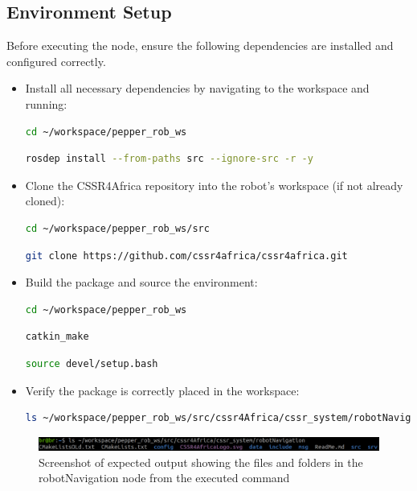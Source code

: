 \documentclass{CSSRforAfrica}
\begin{document}
\subsection{Environment Setup}
Before executing the node, ensure the following dependencies are installed and configured correctly.
\begin{itemize}
\item Install all necessary dependencies by navigating to the workspace and running:
\begin{lstlisting}[style=withoutNumbering, language=bash]
cd ~/workspace/pepper_rob_ws
\end{lstlisting}
\begin{lstlisting}[style=withoutNumbering, language=bash]
rosdep install --from-paths src --ignore-src -r -y
\end{lstlisting}

\item Clone the CSSR4Africa repository into the robot’s workspace (if not already cloned):
\begin{lstlisting}[style=withoutNumbering, language=bash]
cd ~/workspace/pepper_rob_ws/src
\end{lstlisting}
\begin{lstlisting}[style=withoutNumbering, language=bash]
git clone https://github.com/cssr4africa/cssr4africa.git
\end{lstlisting}

\item Build the package and source the environment:
\begin{lstlisting}[style=withoutNumbering, language=bash]
cd ~/workspace/pepper_rob_ws
\end{lstlisting}
\begin{lstlisting}[style=withoutNumbering, language=bash]
catkin_make
\end{lstlisting}
\begin{lstlisting}[style=withoutNumbering, language=bash]
source devel/setup.bash
\end{lstlisting}
\item Verify the package is correctly placed in the workspace:
\begin{lstlisting}[style=withoutNumbering, language=bash]
ls ~/workspace/pepper_rob_ws/src/cssr4Africa/cssr_system/robotNavigation
\end{lstlisting}
\end{itemize}

\begin{figure}[H]
    \centering
    \includegraphics[width=\linewidth]{Images/navigation_folder.png}
    \caption{Screenshot of expected output showing the files and folders in the robotNavigation node from the executed command}
    \label{fig:sample robot navigation folder structure}
\end{figure}
\end{document}
